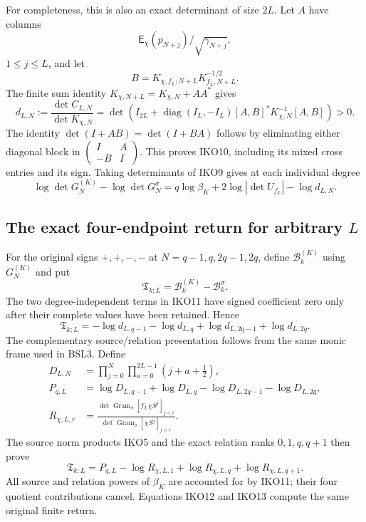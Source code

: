 \documentclass[11pt,a4paper]{article}
\begin{document}
For completeness, this is also an exact determinant of size $2L$.
Let $A$ have columns \[\mathsf E_\chi(p_{N+j})/\sqrt{\gamma_{N+j}},\]
$1\leq j\leq L$, and let
\[B=K_{\chi,f_L;N+L}K_{f_L,N+L}^{-1/2}.\] The finite sum identity
$K_{\chi,N+L}=K_{\chi,N}+AA^*$ gives
\[
 d_{L,N}:=\frac{\det C_{L,N}}{\det K_{\chi,N}}
 =\det\left(I_{2L}+\operatorname{diag}(I_L,-I_L)
       [A,B]^*K_{\chi,N}^{-1}[A,B]\right)>0.
 \tag{IKO10}
\]
The identity $\det(I+AB)=\det(I+BA)$ follows by eliminating either
diagonal block in $\left(\begin{smallmatrix}I&A\\-B&I\end{smallmatrix}\right)$.
This proves IKO10, including its mixed cross entries and its sign.
Taking determinants of IKO9 gives at each individual degree
\[
 \log\det G_N^{(K)}-\log\det G_N^\sigma
 =q\log\beta_K+2\log|\det U_{f_L}|-\log d_{L,N}.
 \tag{IKO11}
\]

\subsection{The exact four-endpoint return for arbitrary $L$}
For the original signs $+,+,-,-$ at $N=q-1,q,2q-1,2q$, define
$\mathcal B_k^{(K)}$ using $G_N^{(K)}$ and put
\[
 \mathfrak T_{k;L}=\mathcal B_k^{(K)}-\mathcal B_k^\sigma.
\]
The two degree-independent terms in IKO11 have signed coefficient
zero only after their complete values have been retained. Hence
\[
 \mathfrak T_{k;L}
   =-\log d_{L,q-1}-\log d_{L,q}
                  +\log d_{L,2q-1}+\log d_{L,2q}.
 \tag{IKO12}
\]
The complementary source/relation presentation follows from the
same monic frame used in BSL3. Define
\[
 \begin{split}
 D_{L,N}&=\prod_{j=0}^N\prod_{a=0}^{2L-1}(j+a+\tfrac12),\\
 P_{q,L}&=\log D_{L,q-1}+\log D_{L,q}
                    -\log D_{L,2q-1}-\log D_{L,2q},\\
 R_{\chi,L,r}&=\frac{\det\operatorname{Gram}_{\sigma}
                    [f_L\chi S^j]_{j<r}}
                  {\det\operatorname{Gram}_{\sigma}
                    [\chi S^j]_{j<r}}.
 \end{split}
\]
The source norm products IKO5 and the exact relation ranks $0,1,q,q+1$
then prove
\[
 \boxed{\mathfrak T_{k;L}
       =P_{q,L}-\log R_{\chi,L,1}
                    +\log R_{\chi,L,q}+\log R_{\chi,L,q+1}.}
 \tag{IKO13}
\]
All source and relation powers of $\beta_K$ are accounted for by
IKO11; their four quotient contributions cancel. Equations IKO12 and
IKO13 compute the same original finite return.
\end{document}
